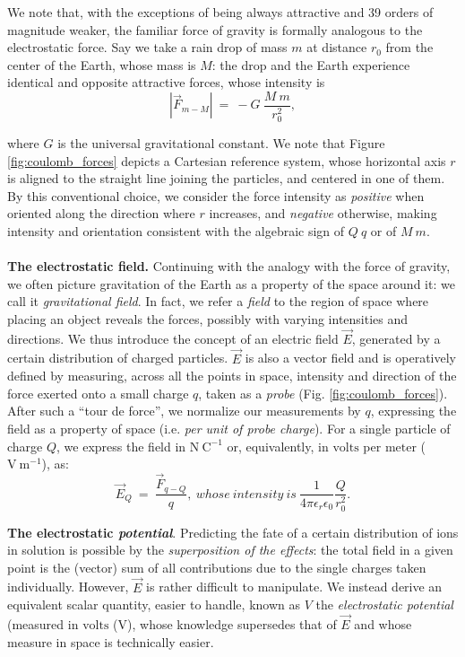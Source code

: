 We note that, with the exceptions of being always attractive and 39 orders of magnitude weaker, the familiar force of gravity is formally analogous to the electrostatic force. Say we take a rain drop of mass $m$ at distance $r_0$ from the center of the Earth, whose mass is $M$: the drop and the Earth experience identical and opposite attractive forces, whose intensity is
$$|\vec{F}_{m-M}|\ =\ - G\ \frac{M\ m}{r_0^2},$$

where $G$ is the universal gravitational constant. We note that
Figure \ref{fig:coulomb_forces} depicts a Cartesian reference system, whose horizontal axis \(r\) is aligned to the straight line joining the particles, and centered in one of them. By this conventional choice, we consider the force intensity as \textit{positive} when oriented along the direction where \(r\) increases, and \textit{negative} otherwise, making intensity and orientation consistent with the algebraic sign of \(Q\ q\) or of \(M\ m\). 
\\
\\

\textbf{The electrostatic field.} Continuing with the analogy with the force of gravity, we often picture gravitation of the Earth as a property of the space around it: we call it \textit{gravitational field}. In fact, we refer a \textit{field} to the region of space where placing an object reveals the forces, possibly with varying intensities and directions. 
We thus introduce the concept of an electric field $\vec{E}$, generated by a certain distribution of charged particles. $\vec{E}$ is also a vector field and is operatively defined by measuring, across all the points in space, intensity and direction of the force exerted onto a small charge $q$, taken as a \textit{probe} (Fig. \ref{fig:coulomb_forces}). After such a ``tour de force'', we normalize our measurements by $q$, expressing the field as a property of space (i.e. \textit{per unit of probe charge}). For a single particle of charge $Q$, we express the field in $\mathrm{N\ C^{-1}}$ or, equivalently, in $\mathrm{volts}$ per $\mathrm{meter}$ ($\mathrm{V\ m^{-1}}$), as:
$$\vec{E}_{Q}\ =\ \frac{\vec{F}_{q-Q}}{q},\ whose\ intensity\ is\ \frac{1}{4 \pi \epsilon_r \epsilon_0} \frac{Q}{r_0^2}.$$

\textbf{The electrostatic \textit{potential}}.
Predicting the fate of a certain distribution of ions in solution is possible by  the \textit{superposition of the effects}: the total field in a given point is the (vector) sum of all contributions due to the single charges taken individually. However, $\vec{E}$ is rather difficult to manipulate. We instead derive an equivalent scalar quantity, easier to handle, known as \(V\) the \textit{electrostatic potential} (measured in $\mathrm{volts}$ ($\mathrm{V}$), whose knowledge supersedes that of $\vec{E}$ and whose measure in space is technically easier. 

